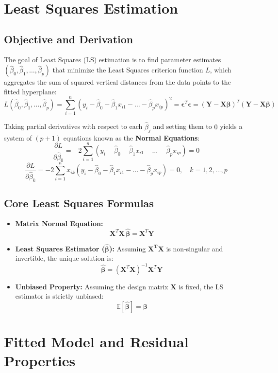 \documentclass{article}
\begin{document}
\section{Least Squares Estimation}

\subsection{Objective and Derivation}
The goal of Least Squares (LS) estimation is to find parameter estimates $(\hat{\beta}_0, \hat{\beta}_1, \dots, \hat{\beta}_p)$ that minimize the Least Squares criterion function $L$, which aggregates the sum of squared vertical distances from the data points to the fitted hyperplane:
$$L(\hat{\beta}_0, \hat{\beta}_1, \dots, \hat{\beta}_p) = \sum_{i=1}^{n} (y_i - \hat{\beta}_0 - \hat{\beta}_1 x_{i1} - \dots - \hat{\beta}_p x_{ip})^2 = \boldsymbol{\epsilon}^T \boldsymbol{\epsilon} = (\mathbf{Y} - \mathbf{X}\boldsymbol{\beta})^T (\mathbf{Y} - \mathbf{X}\boldsymbol{\beta})$$

Taking partial derivatives with respect to each $\hat{\beta}_j$ and setting them to $0$ yields a system of $(p+1)$ equations known as the \textbf{Normal Equations}:
$$\frac{\partial L}{\partial \hat{\beta}_0} = -2 \sum_{i=1}^{n} (y_i - \hat{\beta}_0 - \hat{\beta}_1 x_{i1} - \dots - \hat{\beta}_p x_{ip}) = 0$$
$$\frac{\partial L}{\partial \hat{\beta}_k} = -2 \sum_{i=1}^{n} x_{ik} (y_i - \hat{\beta}_0 - \hat{\beta}_1 x_{i1} - \dots - \hat{\beta}_p x_{ip}) = 0, \quad k = 1, 2, \dots, p$$

\subsection{Core Least Squares Formulas}
\begin{itemize}
    \item \textbf{Matrix Normal Equation:}
    $$\mathbf{X}^T\mathbf{X}\,\hat{\boldsymbol{\beta}} = \mathbf{X}^T\mathbf{Y}$$
    \item \textbf{Least Squares Estimator ($\hat{\boldsymbol{\beta}}$):} Assuming $\mathbf{X^TX}$ is non-singular and invertible, the unique solution is:
    $$\hat{\boldsymbol{\beta}} = (\mathbf{X}^T\mathbf{X})^{-1}\mathbf{X}^T\mathbf{Y}$$
    \item \textbf{Unbiased Property:} Assuming the design matrix $\mathbf{X}$ is fixed, the LS estimator is strictly unbiased:
    $$\mathbb{E}[\hat{\boldsymbol{\beta}}] = \boldsymbol{\beta}$$
\end{itemize}
\newpage
\section{Fitted Model and Residual Properties}
\end{document}
